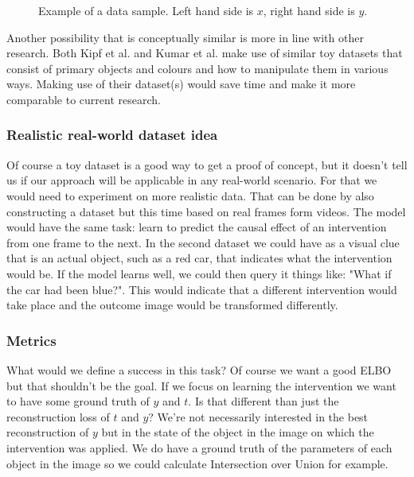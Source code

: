 \documentclass{article}
\begin{document}
\begin{figure}
    \centering
\quad
{}
    \caption{Example of a data sample. Left hand side is $x$, right hand side is $y$.}
    \label{fig:toy_data_sample}
\end{figure}

Another possibility that is conceptually similar is more in line with other research\cite{kumar2019videoflow}\cite{kipf2019contrastive}. Both Kipf et al. and Kumar et al. make use of similar toy datasets that consist of primary objects and colours and how to manipulate them in various ways. Making use of their dataset(s) would save time and make it more comparable to current research.

\subsubsection*{Realistic real-world dataset idea}
Of course a toy dataset is a good way to get a proof of concept, but it doesn't tell us if our approach will be applicable in any real-world scenario. For that we would need to experiment on more realistic data. That can be done by also constructing a dataset but this time based on real frames form videos. The model would have the same task: learn to predict the causal effect of an intervention from one frame to the next. In the second dataset we could have as a visual clue that is an actual object, such as a red car, that indicates what the intervention would be. If the model learns well, we could then query it things like: "What if the car had been blue?". This would indicate that a different intervention would take place and the outcome image would be transformed differently.

\subsubsection*{Metrics}
What would we define a success in this task? Of course we want a good ELBO but that shouldn't be the goal. If we focus on learning the intervention we want to have some ground truth of $y$ and $t$. Is that different than just the reconstruction loss of $t$ and $y$? We're not necessarily interested in the best reconstruction of $y$ but in the state of the object in the image on which the intervention was applied. We do have a ground truth of the parameters of each object in the image so we could calculate Intersection over Union for example.
\end{document}
